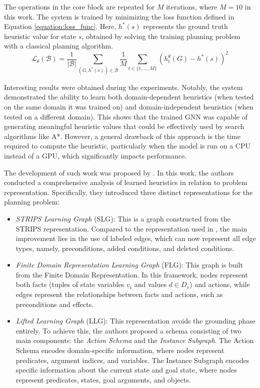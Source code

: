 The operations in the core block are repeated for $M$ iterations, where $M = 10$ in this work.
The system is trained by minimizing the loss function defined in Equation \ref{equation:loss_func}. Here, $h^{*}(s)$ represents the ground truth heuristic value for state $s$, obtained by solving the training planning problem with a classical planning algorithm.
\begin{equation}
    \mathcal{L}_\theta(\mathcal{B})=\frac{1}{|\mathcal{B}|} \sum_{\left(G, h^*(s)\right) \in \mathcal{B}} \frac{1}{M} \sum_{t \in \{1, \ldots, M\}}\left(h_t^\theta(G)-h^*(s)\right)^2
    \label{equation:loss_func}
\end{equation}

Interesting results were obtained during the experiments. Notably, the system demonstrated the ability to learn both domain-dependent heuristics (when tested on the same domain it was trained on) and domain-independent heuristics (when tested on a different domain). This shows that the trained GNN was capable of generating meaningful heuristic values that could be effectively used by search algorithms like A*. However, a general drawback of this approach is the time required to compute the heuristic, particularly when the model is run on a CPU instead of a GPU, which significantly impacts performance.

The development of such work was proposed by \cite{chen2024learning}. In this work, the authors conducted a comprehensive analysis of learned heuristics in relation to problem representation. Specifically, they introduced three distinct representations for the planning problem:

\begin{itemize}
    \item \textit{STRIPS Learning Graph} (SLG): This is a graph constructed from the STRIPS representation. Compared to the representation used in \cite{shen2020learning}, the main improvement lies in the use of labeled edges, which can now represent all edge types, namely, preconditions, added conditions, and deleted conditions.
    
    \item \textit{Finite Domain Representation Learning Graph} (FLG): This graph is built from the Finite Domain Representation. In this framework, nodes represent both facts (tuples of state variables $v_i$ and values $d \in D_v$) and actions, while edges represent the relationships between facts and actions, such as preconditions and effects.
    
    \item \textit{Lifted Learning Graph} (LLG): This representation avoids the grounding phase entirely. To achieve this, the authors proposed a schema consisting of two main components: the \textit{Action Schema} and the \textit{Instance Subgraph}. The Action Schema encodes domain-specific information, where nodes represent predicates, argument indices, and variables. The Instance Subgraph encodes specific information about the current state and goal state, where nodes represent predicates, states, goal arguments, and objects.
\end{itemize}

